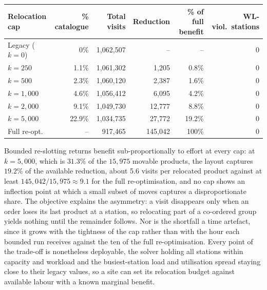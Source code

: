 \documentclass[]{interact}
\begin{document}
\begin{table}[H]
\centering
{}
{\small\begin{tabular*}{\textwidth}{@{\extracolsep{\fill}}lrrrrr@{}}
\toprule
Relocation cap & \% catalogue & Total visits & Reduction & \% of full benefit & WL-viol.\ stations \\
\midrule
Legacy ($k=0$) & 0\% & 1{,}062{,}507 & -- & -- & 0 \\
$k=250$        & 1.1\% & 1{,}061{,}302 & 1{,}205 & 0.8\% & 0 \\
$k=500$        & 2.3\% & 1{,}060{,}120 & 2{,}387 & 1.6\% & 0 \\
$k=1{,}000$    & 4.6\% & 1{,}056{,}412 & 6{,}095 & 4.2\% & 0 \\
$k=2{,}000$    & 9.1\% & 1{,}049{,}730 & 12{,}777 & 8.8\% & 0 \\
$k=5{,}000$    & 22.9\% & 1{,}034{,}735 & 27{,}772 & 19.2\% & 0 \\
Full re-opt.   & --     & 917{,}465 & 145{,}042 & 100\% & 0 \\
\bottomrule
\end{tabular*}}
\label{tab:reassign}
\end{table}

Bounded re-slotting returns benefit sub-proportionally to effort at every cap: at $k = 5{,}000$, which is $31.3\%$ of the $15{,}975$ movable products, the layout captures $19.2\%$ of the available reduction, about 5.6 visits per relocated product against at least $145{,}042/15{,}975 \approx 9.1$ for the full re-optimisation, and no cap shows an inflection point at which a small subset of moves captures a disproportionate share. The objective explains the asymmetry: a visit disappears only when an order loses its last product at a station, so relocating part of a co-ordered group yields nothing until the remainder follows. Nor is the shortfall a time artefact, since it grows with the tightness of the cap rather than with the hour each bounded run receives against the ten of the full re-optimisation. Every point of the trade-off is nonetheless deployable, the solver holding all stations within capacity and workload and the busiest-station load and utilisation spread staying close to their legacy values, so a site can set its relocation budget against available labour with a known marginal benefit.
\end{document}
